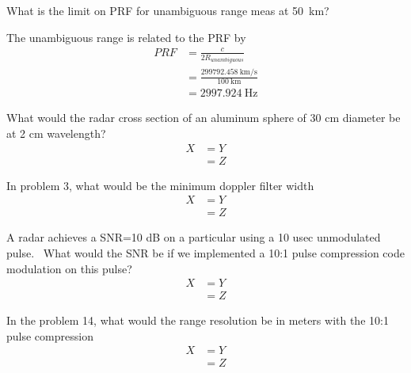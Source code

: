\documentclass[12pt]{article}
\newenvironment{exercise}[2][Exercise]{\begin{trivlist}
    \item[\hskip \labelsep {\bfseries #1}\hskip \labelsep {\bfseries #2.}]}{\end{trivlist}}
\begin{document}
      \begin{exercise}{11}
      What is the limit on PRF for unambiguous range meas at \SI{50}{\km}?

      The unambiguous range is related to the PRF by
      \begin{align*}
      PRF & = \frac{c}{2 R_{unambiguous}}\\
      & = \frac{\SI{299792.458}{\km\per\second}}{\SI{100}{\km}}\\
      & = \SI{2997.924}{\Hz}
      \end{align*}
      \end{exercise}
      
      \begin{exercise}{12}
      What would the radar cross section of an aluminum sphere of 30 cm diameter be at 2 cm wavelength?
      \begin{align*}
      X & = Y\\
      & = Z
      \end{align*}
      \end{exercise}
      
      \begin{exercise}{13}
      In problem 3, what would be the minimum doppler filter width
      \begin{align*}
      X & = Y\\
      & = Z
      \end{align*}
      \end{exercise}
      
      \begin{exercise}{14}
      A radar achieves a SNR=10 dB on a particular using a 10 usec unmodulated pulse.  What would the SNR be if we implemented a 10:1 pulse compression code modulation on this pulse?  
      \begin{align*}
      X & = Y\\
      & = Z
      \end{align*}
      \end{exercise}
      
      \begin{exercise}{15}
      In the problem 14, what would the range resolution be in meters with the 10:1 pulse compression      
      \begin{align*}
      X & = Y\\
      & = Z
      \end{align*}
      \end{exercise}




      
	      
	       
	       
\end{document}
